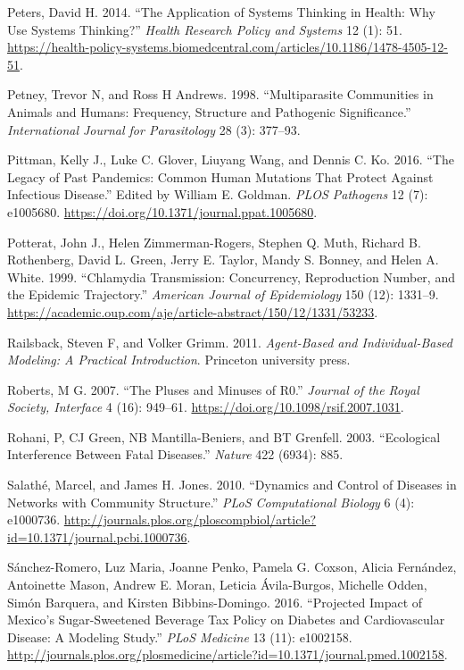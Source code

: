\documentclass[
]{book}
\begin{document}
\leavevmode\hypertarget{ref-peters14}{}%
Peters, David H. 2014. ``The Application of Systems Thinking in Health: Why Use Systems Thinking?'' \emph{Health Research Policy and Systems} 12 (1): 51. \url{https://health-policy-systems.biomedcentral.com/articles/10.1186/1478-4505-12-51}.

\leavevmode\hypertarget{ref-petney98}{}%
Petney, Trevor N, and Ross H Andrews. 1998. ``Multiparasite Communities in Animals and Humans: Frequency, Structure and Pathogenic Significance.'' \emph{International Journal for Parasitology} 28 (3): 377--93.

\leavevmode\hypertarget{ref-pittman16}{}%
Pittman, Kelly J., Luke C. Glover, Liuyang Wang, and Dennis C. Ko. 2016. ``The Legacy of Past Pandemics: Common Human Mutations That Protect Against Infectious Disease.'' Edited by William E. Goldman. \emph{PLOS Pathogens} 12 (7): e1005680. \url{https://doi.org/10.1371/journal.ppat.1005680}.

\leavevmode\hypertarget{ref-potterat99}{}%
Potterat, John J., Helen Zimmerman-Rogers, Stephen Q. Muth, Richard B. Rothenberg, David L. Green, Jerry E. Taylor, Mandy S. Bonney, and Helen A. White. 1999. ``Chlamydia Transmission: Concurrency, Reproduction Number, and the Epidemic Trajectory.'' \emph{American Journal of Epidemiology} 150 (12): 1331--9. \url{https://academic.oup.com/aje/article-abstract/150/12/1331/53233}.

\leavevmode\hypertarget{ref-railsback11}{}%
Railsback, Steven F, and Volker Grimm. 2011. \emph{Agent-Based and Individual-Based Modeling: A Practical Introduction}. Princeton university press.

\leavevmode\hypertarget{ref-roberts07}{}%
Roberts, M G. 2007. ``The Pluses and Minuses of R0.'' \emph{Journal of the Royal Society, Interface} 4 (16): 949--61. \url{https://doi.org/10.1098/rsif.2007.1031}.

\leavevmode\hypertarget{ref-rohani03}{}%
Rohani, P, CJ Green, NB Mantilla-Beniers, and BT Grenfell. 2003. ``Ecological Interference Between Fatal Diseases.'' \emph{Nature} 422 (6934): 885.

\leavevmode\hypertarget{ref-salathe10}{}%
Salathé, Marcel, and James H. Jones. 2010. ``Dynamics and Control of Diseases in Networks with Community Structure.'' \emph{PLoS Computational Biology} 6 (4): e1000736. \url{http://journals.plos.org/ploscompbiol/article?id=10.1371/journal.pcbi.1000736}.

\leavevmode\hypertarget{ref-sanchez-romero16}{}%
Sánchez-Romero, Luz Maria, Joanne Penko, Pamela G. Coxson, Alicia Fernández, Antoinette Mason, Andrew E. Moran, Leticia Ávila-Burgos, Michelle Odden, Simón Barquera, and Kirsten Bibbins-Domingo. 2016. ``Projected Impact of Mexico's Sugar-Sweetened Beverage Tax Policy on Diabetes and Cardiovascular Disease: A Modeling Study.'' \emph{PLoS Medicine} 13 (11): e1002158. \url{http://journals.plos.org/plosmedicine/article?id=10.1371/journal.pmed.1002158}.
\end{document}
